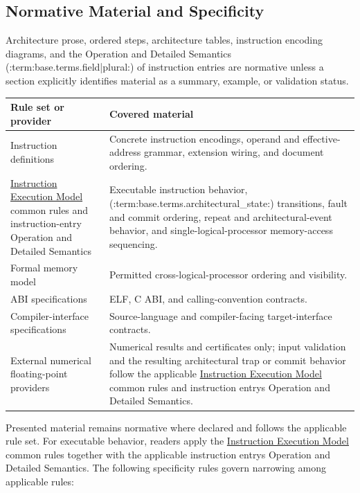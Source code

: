 \subsection{Normative Material and Specificity}

Architecture prose, ordered steps, architecture tables, instruction encoding diagrams, and the Operation
and Detailed Semantics (:term:base.terms.field|plural:) of instruction entries are normative unless a section explicitly identifies material
as a summary, example, or validation status.

\noindent
\begin{tabularx}{\linewidth}{@{}>{\raggedright\arraybackslash}p{1.55in}X@{}}
\toprule
\textbf{Rule set or provider} & \textbf{Covered material}\\
\midrule
Instruction definitions & Concrete instruction encodings, operand and effective-address grammar, extension wiring,
and document ordering.\\
\hyperref[page:instruction-execution-model]{Instruction Execution Model} common rules and instruction-entry Operation
and Detailed Semantics & Executable instruction behavior, (:term:base.terms.architectural_state:) transitions, fault and commit ordering,
repeat and architectural-event behavior, and single-logical-processor memory-access sequencing.\\
Formal memory model & Permitted cross-logical-processor ordering and visibility.\\
ABI specifications & ELF, C ABI, and calling-convention contracts.\\
Compiler-interface specifications & Source-language and compiler-facing target-interface contracts.\\
External numerical floating-point providers & Numerical results and certificates only; input validation and the resulting
architectural trap or commit behavior follow the applicable
\hyperref[page:instruction-execution-model]{Instruction Execution Model} common rules and instruction entry\textquotesingle{}s Operation
and Detailed Semantics.\\
\bottomrule
\end{tabularx}

Presented material remains normative where declared and follows the applicable
rule set. For executable behavior, readers apply the
\hyperref[page:instruction-execution-model]{Instruction Execution Model} common
rules together with the applicable instruction entry\textquotesingle{}s Operation and Detailed
Semantics. The following specificity rules govern narrowing among applicable
rules:

